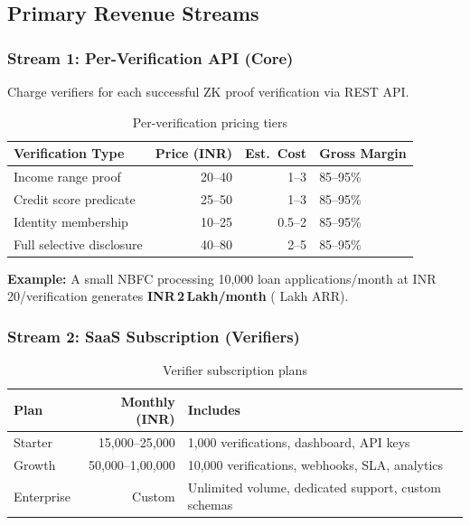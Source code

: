 \documentclass[11pt,a4paper]{article}
\begin{document}
\subsection{Primary Revenue Streams}

\subsubsection{Stream 1: Per-Verification API (Core)}

Charge verifiers for each successful ZK proof verification via REST API.

\begin{table}[H]
  \centering
  \caption{Per-verification pricing tiers}
  \renewcommand{\arraystretch}{1.2}
  \begin{tabular}{@{}lrrl@{}}
    \toprule
    \textbf{Verification Type} & \textbf{Price (INR)} & \textbf{Est.\ Cost} & \textbf{Gross Margin} \\
    \midrule
    Income range proof & 20--40 & 1--3 & 85--95\% \\
    Credit score predicate & 25--50 & 1--3 & 85--95\% \\
    Identity membership & 10--25 & 0.5--2 & 85--95\% \\
    Full selective disclosure & 40--80 & 2--5 & 85--95\% \\
    \bottomrule
  \end{tabular}
\end{table}

\textbf{Example:} A small NBFC processing 10,000 loan applications/month at INR\,20/verification generates \textbf{INR\,2\,Lakh/month} ( Lakh ARR).

\subsubsection{Stream 2: SaaS Subscription (Verifiers)}

\begin{table}[H]
  \centering
  \caption{Verifier subscription plans}
  \renewcommand{\arraystretch}{1.2}
  \begin{tabularx}{\textwidth}{@{}l r X@{}}
    \toprule
    \textbf{Plan} & \textbf{Monthly (INR)} & \textbf{Includes} \\
    \midrule
    Starter & 15,000--25,000 & 1,000 verifications, dashboard, API keys \\
    Growth & 50,000--1,00,000 & 10,000 verifications, webhooks, SLA, analytics \\
    Enterprise & Custom & Unlimited volume, dedicated support, custom schemas \\
    \bottomrule
  \end{tabularx}
\end{table}
\end{document}
